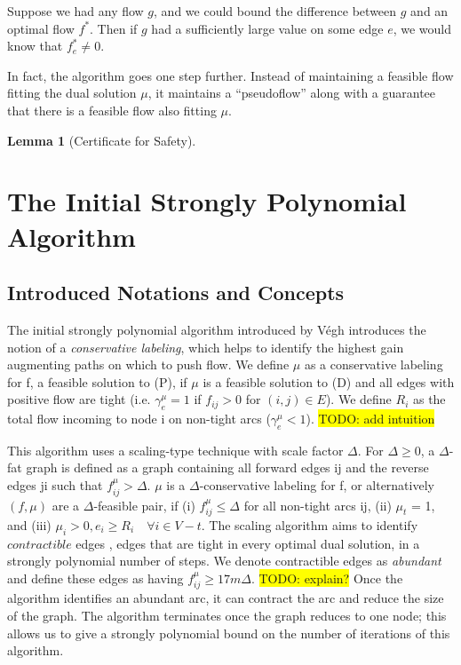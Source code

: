 \documentclass[11pt]{article}
\newtheorem{lemma}[theorem]{Lemma}
\theoremstyle{definition}
\theoremstyle{definition}
\newcommand{\geu}{\gamma_e^{\mu}}
\newcommand{\todo}[1]{\colorbox{yellow}{TODO: #1}}
\begin{document}
	Suppose we had any flow $g$, and we could bound the difference between $g$ and an optimal
	flow $f^*$. Then if $g$ had a sufficiently large value on some edge $e$, we would know that
	$f^*_e \neq 0$.
	
	In fact, the algorithm goes one step further. Instead of maintaining a feasible flow
	fitting the dual solution $\mu$, it maintains a ``pseudoflow'' along with a guarantee
	that there is a feasible flow also fitting $\mu$.
	\begin{lemma}[Certificate for Safety]
		
	\end{lemma}
	

\section{The Initial Strongly Polynomial Algorithm}
\subsection{Introduced Notations and Concepts}
The initial strongly polynomial algorithm introduced by Végh \cite{Vegh2013} introduces the notion of a \textit{conservative labeling}, which helps to identify the highest gain augmenting paths on which to push flow. We define $\mu$ as a conservative labeling for f, a feasible solution to (P), if $\mu$ is a feasible solution to (D) and all edges with positive flow are tight (i.e. $\geu = 1$ if $f_{ij} > 0$ for $(i, j) \in E$). We define $R_i$ as the total flow incoming to node i on non-tight arcs ($\geu < 1$). \todo{add intuition}

This algorithm uses a scaling-type technique with scale factor $\Delta$. For $\Delta \geq 0$, a $\Delta$-fat graph is defined as a graph containing all forward edges ij and the reverse edges ji such that $f_{ij}^\mu > \Delta$. $\mu$ is a $\Delta$-conservative labeling for f, or alternatively $(f, \mu)$ are a $\Delta$-feasible pair, if (i) $f_{ij}^\mu \leq \Delta$ for all non-tight arcs ij, (ii) $\mu_t$ = 1, and (iii) $\mu_i > 0, e_i \geq R_i \quad \forall i \in V -t$. The scaling algorithm aims to identify $\textit{contractible}$ edges \cite{Orlin1988}, edges that are tight in every optimal dual solution, in a strongly polynomial number of steps. We denote contractible edges as \emph{abundant} and define these edges as having $f_{ij}^\mu \geq 17m\Delta$. \todo{explain?} Once the algorithm identifies an abundant arc, it can contract the arc and reduce the size of the graph. The algorithm terminates once the graph reduces to one node; this allows us to give a strongly polynomial bound on the number of iterations of this algorithm.
\end{document}
